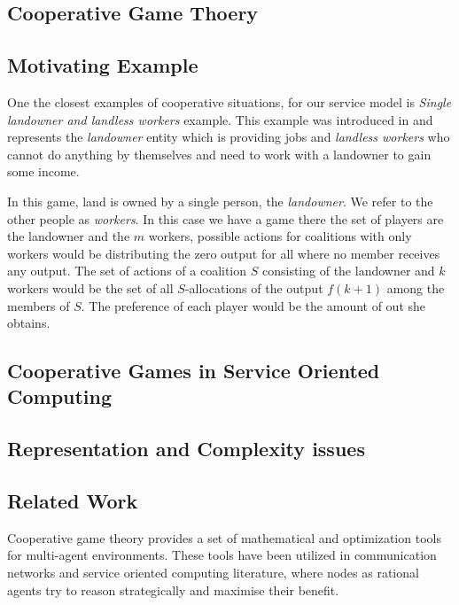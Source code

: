         \subsection{Cooperative Game Thoery}\label{sec:BRWS}

        \subsection{Motivating Example}\label{sec:CWSDefinition}
        
        One the closest examples of cooperative situations, for our service model is \emph{Single landowner and landless workers} example. 
        This example was introduced in \cite{GVK369342747} and represents the \emph{landowner} entity which is providing jobs and \emph{landless workers} who cannot do anything by themselves and need to work with a landowner to gain some income.
        
        In this game, land is owned by a single person, the \emph{landowner}. We refer to the other people as \emph{workers}. In this case we have a game there the set of players are the landowner and the $m$ workers, possible actions for coalitions with only workers would be distributing the zero output for all where no member receives any output. The set of actions of a coalition $S$ consisting of the landowner and $k$ workers would be the set of all $S$-allocations of the output $f(k+1)$ among the members of $S$. The preference of each player would be the amount of out she obtains.

        \subsection{Cooperative Games in Service Oriented Computing}\label{sec:CWSArchitecture}

        \subsection{Representation and Complexity issues}\label{sec:CWSArchitecture}
        
        \subsection{Related Work}\label{sec:CGTMSRelatedWork}

Cooperative game theory provides a set of mathematical and optimization tools for multi-agent environments. These tools have been utilized in communication networks and service oriented computing literature, where nodes as rational agents try to reason strategically and maximise their benefit.





